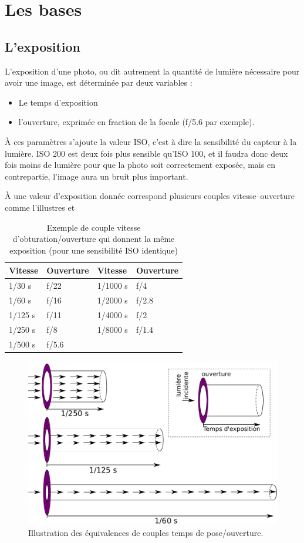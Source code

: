 \documentclass[a4paper,twoside]{article}
\begin{document}
\section{Les bases}
\subsection{L'exposition}
L'exposition d'une photo, ou dit autrement la quantité de lumière nécessaire pour avoir une image, est déterminée par deux variables : 
\begin{itemize}
\item Le temps d'exposition
\item l'ouverture, exprimée en fraction de la focale (f/5.6 par exemple).
\end{itemize}

À ces paramètres s'ajoute la valeur ISO, c'est à dire la sensibilité du capteur à la lumière. ISO 200 est deux fois plus sensible qu'ISO 100, et il faudra donc deux fois moins de lumière pour que la photo soit correctement exposée, mais en contrepartie, l'image aura un bruit plus important. 

À une valeur d'exposition donnée correspond plusieurs couples vitesse--ouverture comme l'illustres  et 

\begin{table}[htb]
\centering
\begin{tabular}{llll}
Vitesse & Ouverture & Vitesse & Ouverture\\\hline
1/30 s & f/22 & 1/1000 s & f/4\\
1/60 s & f/16 & 1/2000 s & f/2.8\\
1/125 s & f/11 & 1/4000 s & f/2\\
1/250 s & f/8 & 1/8000 s & f/1.4\\
1/500 s & f/5.6 
\end{tabular}
\caption{Exemple de couple vitesse d'obturation/ouverture qui donnent la même exposition (pour une sensibilité ISO identique)}\label{tab:exposition-equivalente}
\end{table}

\begin{figure}[htb]
\centering
\includegraphics[width=0.65\linewidth]{figure/exposition.pdf}
\caption{Illustration des équivalences de couples temps de pose/ouverture.}\label{fig:exposition-equivalente}
\end{figure}
\end{document}
